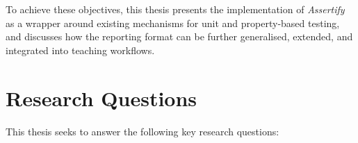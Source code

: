 To achieve these objectives, this thesis presents the implementation of \textit{Assertify} as a wrapper around existing mechanisms for unit and property-based testing,
and discusses how the reporting format can be further generalised, extended, and integrated into teaching workflows.


\section{Research Questions} %




This thesis seeks to answer the following key research questions:
